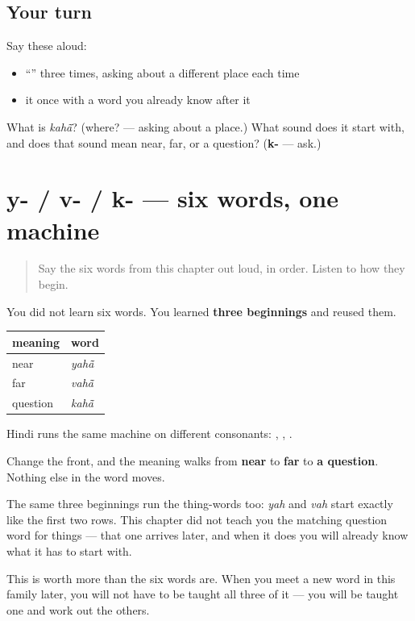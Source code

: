 \subsection*{Your turn}
Say these aloud:

\begin{itemize}
\raggedright
  \item \textquotedblleft{}\textquotedblright{} three times, asking about a different place each time
  \item it once with a word you already know after it
\end{itemize}

\begin{tcolorbox}[breakable,colback=teal!4,colframe=teal!35!black,title={Before you move on}]
What is \emph{kahā̃}? (where? — asking about a place.) What sound does it start with, and does that sound mean near, far, or a question? (\textbf{k-} — ask.)
\end{tcolorbox}
\section[y- / v- / k-]{y- / v- / k- — six words, one machine}

\label{lesson:HI-C40-deixis-system}



\begin{quote}
Say the six words from this chapter out loud, in order. Listen to how they begin.
\end{quote}

\begin{grammarlens}[title={Grammar lens: one slot changes}]
You did not learn six words. You learned \textbf{three beginnings} and reused them.

\noindent
\begin{tabularx}{\linewidth}{@{}>{\raggedright\arraybackslash}X>{\raggedright\arraybackslash}X@{}}
\toprule
\textbf{meaning} & \textbf{word} \\
\midrule
near & \textbf{\hi{यहाँ}} \emph{yahā̃} \\
far & \textbf{\hi{वहाँ}} \emph{vahā̃} \\
question & \textbf{\hi{कहाँ}} \emph{kahā̃} \\
\bottomrule
\end{tabularx}

Hindi runs the same machine on different consonants: , , .

Change the front, and the meaning walks from \textbf{near} to \textbf{far} to \textbf{a question}. Nothing else in the word moves.

The same three beginnings run the thing-words too: \textbf{} \emph{yah} and \textbf{} \emph{vah} start exactly like the first two rows. This chapter did not teach you the matching question word for things — that one arrives later, and when it does you will already know what it has to start with.

This is worth more than the six words are. When you meet a new word in this family later, you will not have to be taught all three of it — you will be taught one and work out the others.
\end{grammarlens}

